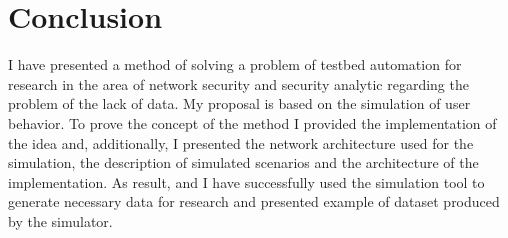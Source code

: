 
\section{Conclusion}

I have presented a method of solving a problem of testbed automation for research in the area of network security and security analytic regarding the problem of the lack of data. My proposal is based on the simulation of user behavior. To prove the concept of the method I provided the implementation of the idea and, additionally, I presented the network  architecture used for the simulation, the description of simulated scenarios and the architecture of the implementation. As result, and I have successfully used the simulation tool to generate necessary data for research and presented example of dataset produced by the simulator.